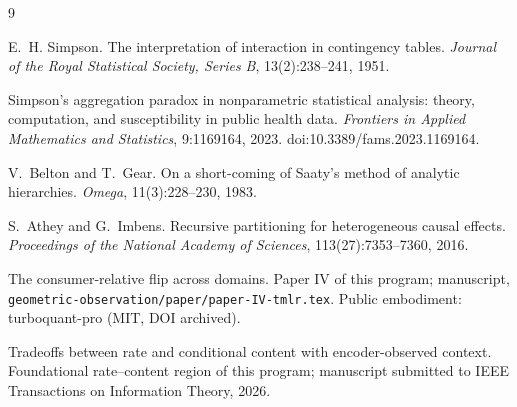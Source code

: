 \documentclass[11pt]{article}
\theoremstyle{definition}
\theoremstyle{remark}
\begin{document}
\begin{thebibliography}{9}

E.~H. Simpson.
The interpretation of interaction in contingency tables.
\emph{Journal of the Royal Statistical Society, Series B}, 13(2):238--241,
1951.

Simpson's aggregation paradox in nonparametric statistical analysis: theory,
computation, and susceptibility in public health data.
\emph{Frontiers in Applied Mathematics and Statistics}, 9:1169164, 2023.
doi:10.3389/fams.2023.1169164.

V.~Belton and T.~Gear.
On a short-coming of Saaty's method of analytic hierarchies.
\emph{Omega}, 11(3):228--230, 1983.

S.~Athey and G.~Imbens.
Recursive partitioning for heterogeneous causal effects.
\emph{Proceedings of the National Academy of Sciences},
113(27):7353--7360, 2016.

The consumer-relative flip across domains.
Paper IV of this program; manuscript,
\texttt{geometric-observation/paper/paper-IV-tmlr.tex}.
Public embodiment: turboquant-pro (MIT, DOI archived).

Tradeoffs between rate and conditional content with encoder-observed context.
Foundational rate--content region of this program; manuscript submitted to
IEEE Transactions on Information Theory, 2026.

\end{thebibliography}
\end{document}
